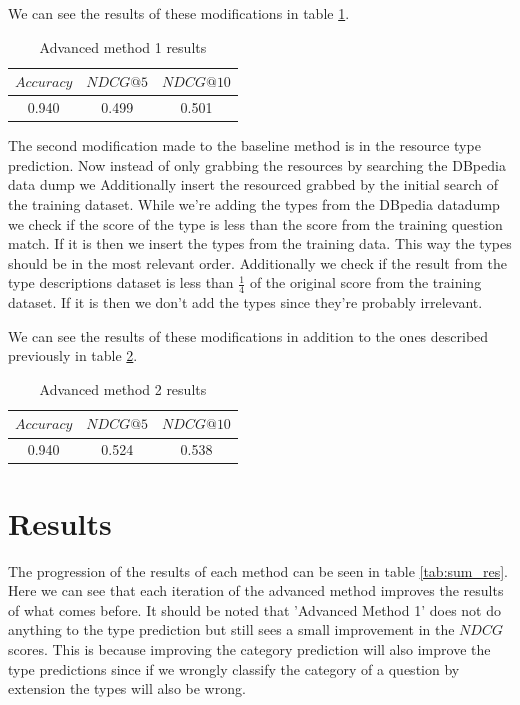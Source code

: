 \documentclass[sigconf]{acmart}
\begin{document}
We can see the results of these modifications in table \ref{tab:advanced1_res}.

\begin{table}[h]
    \centering
    \caption{Advanced method 1 results}
    \begin{tabular}{c|c|c}
    $Accuracy$ & $NDCG@5$ & $NDCG@10$ \\
    \hline
    0.940 & 0.499 & 0.501
    \end{tabular}
    \label{tab:advanced1_res}
\end{table}

The second modification made to the baseline method is in the resource type prediction. Now instead of only grabbing the resources by searching the DBpedia data dump we Additionally insert the resourced grabbed by the initial search of the training dataset. While we're adding the types from the DBpedia datadump we check if the score of the type is less than the score from the training question match. If it is then we insert the types from the training data. This way the types should be in the most relevant order. Additionally we check if the result from the type descriptions dataset is less than $\frac{1}{4}$ of the original score from the training dataset. If it is then we don't add the types since they're probably irrelevant. 

We can see the results of these modifications in addition to the ones described previously in table \ref{tab:advanced2_res}.

\begin{table}[h]
    \centering
    \caption{Advanced method 2 results}
    \begin{tabular}{c|c|c}
    $Accuracy$ & $NDCG@5$ & $NDCG@10$ \\
    \hline
    0.940 & 0.524 & 0.538
    \end{tabular}
    \label{tab:advanced2_res}
\end{table}


\section{Results}
The progression of the results of each method can be seen in table \ref{tab:sum_res}. Here we can see that each iteration of the advanced method improves the results of what comes before. It should be noted that 'Advanced Method 1' does not do anything to the type prediction but still sees a small improvement in the $NDCG$ scores. This is because improving the category prediction will also improve the type predictions since if we wrongly classify the category of a question by extension the types will also be wrong. 
\end{document}
